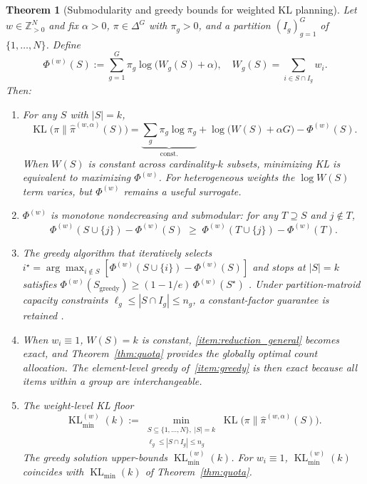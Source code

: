 \documentclass[10pt,journal]{IEEEtran}
\newcommand{\1}{\mathbf{1}}
\DeclareMathOperator{\KL}{KL}
\theoremstyle{ieeethm}
\newtheorem{theorem}{Theorem}
\begin{document}
\begin{theorem}[Submodularity and greedy bounds for weighted KL planning]
\label{thm:weighted_kl}
Let $w\in\mathbb{Z}_{>0}^N$ and fix $\alpha>0$, $\pi\in\Delta^G$ with $\pi_g>0$, and
a partition $(I_g)_{g=1}^G$ of $\{1,\dots,N\}$. Define
\[
\Phi^{(w)}(S):=\sum_{g=1}^G \pi_g\log\!\big(W_g(S)+\alpha\big),
\quad
W_g(S)=\sum_{i\in S\cap I_g} w_i.
\]
Then:
\begin{enumerate}[label=(\roman*)]
    \item\label{item:reduction_general}
    For any $S$ with $|S|=k$,
    \begin{equation}
    \label{eq:kl_phi_decomp}
    \KL\!\big(\pi\big\|\hat\pi^{(w,\alpha)}(S)\big)
    =
    \underbrace{\sum_{g}\pi_g\log\pi_g}_{\text{const.}}
    + \log\!\big(W(S)+\alpha G\big)
    - \Phi^{(w)}(S).
    \end{equation}
    When $W(S)$ is constant across cardinality-$k$ subsets, minimizing KL is
    equivalent to maximizing $\Phi^{(w)}$. For heterogeneous weights the
    $\log W(S)$ term varies, but $\Phi^{(w)}$ remains a useful surrogate.

    \item\label{item:submodular}
    $\Phi^{(w)}$ is monotone nondecreasing and submodular: for any
    $T\supseteq S$ and $j\notin T$,
    \begin{equation}
    \label{eq:diminishing_returns}
    \Phi^{(w)}(S\cup\{j\})-\Phi^{(w)}(S)
    \;\ge\;
    \Phi^{(w)}(T\cup\{j\})-\Phi^{(w)}(T).
    \end{equation}

    \item\label{item:greedy}
    The greedy algorithm that iteratively selects
    $i^\star = \arg\max_{i\notin S} [\Phi^{(w)}(S\cup\{i\})-\Phi^{(w)}(S)]$
    and stops at $|S|=k$ satisfies
    $\Phi^{(w)}(S_{\mathrm{greedy}})\ge (1-1/e)\,\Phi^{(w)}(S^\star)$
    \cite{nemhauser1978submodular}.
    Under partition-matroid capacity constraints
    $\ell_g\le |S\cap I_g|\le n_g$, a constant-factor guarantee is retained
    \cite{calinescu2011matroid,fisher1978submodular}.

    \item\label{item:specialization}
    When $w_i\equiv 1$, $W(S)=k$ is constant, \ref{item:reduction_general}
    becomes exact, and Theorem~\ref{thm:quota} provides the globally optimal
    count allocation. The element-level greedy of~\ref{item:greedy} is then
    exact because all items within a group are interchangeable.

    \item\label{item:floor}
    The weight-level KL floor
    \begin{equation}
    \label{eq:kl_floor_weighted}
    \KL^{(w)}_{\min}(k)
    :=\min_{\substack{S\subseteq\{1,\dots,N\},\;|S|=k\\
    \ell_g\le|S\cap I_g|\le n_g}}
    \KL\!\big(\pi\big\|\hat\pi^{(w,\alpha)}(S)\big).
    \end{equation}
    The greedy solution upper-bounds $\KL^{(w)}_{\min}(k)$.
    For $w_i\equiv 1$, $\KL^{(w)}_{\min}(k)$ coincides with $\KL_{\min}(k)$ of
    Theorem~\ref{thm:quota}.
\end{enumerate}
\end{theorem}
\end{document}
